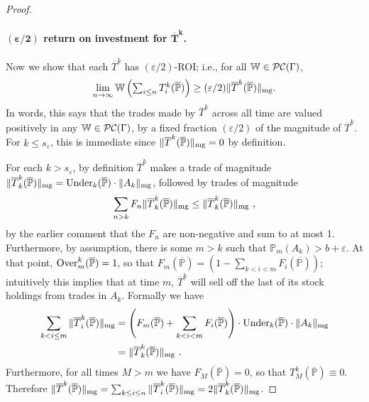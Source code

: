\documentclass[authordate,onecolumn,noenvironments]{miri-tech-article}
\numberwithin{equation}{subsection}
\newcommand{\seq}[1]{{\overline{#1}}}
\newcommand{\aff}{A}
\newcommand{\trade}{T}%
\newcommand{\Trader}{\seq{\trade}} %
\newcommand{\magnit}[1]{{\|#1\|_{\rm mg}}} %
\newcommand{\BelState}{\mathbb{P}}
\newcommand{\pt}{\BelState}
\newcommand{\MP}{\seq{\pt}}
\newcommand{\ftn}{(\MP)} %
\newcommand{\cworlds}{\mathcal{P\-C}} %
\newcommand{\World}{\mathbb{W}}
\newcommand{\Theory}{\Gamma}
\newcommand{\underpriced}{{\rm Under}}
\newcommand{\overpriced}{{\rm Over}}
\newcommand{\localportfoliovalue}{b}
\begin{document}
\begin{proof}
\paragraph{$\bm{(\varepsilon/2)}$ return on investment for $\bm{\Trader^k}$.}

Now we show that each $\Trader^k$ 
has $(\varepsilon/2)$-ROI;  i.e., for all $\World \in \cworlds(\Theory)$, 
%
 \[ \lim_{n \to\infty}\World\left( {\textstyle \sum_{i \leq n} \trade^k_i(\MP)}\right)
\geq
(\varepsilon/2)
\magnit{\Trader^k(\MP)} . \]
%
In words, this says that the trades made by $\Trader^k$ across all time are valued positively in any $\World\in\cworlds(\Theory)$, by a fixed fraction 
$(\varepsilon/2)$ of the magnitude of $\Trader^k$. For $k \leq s_\varepsilon$, this is immediate since $\magnit{\Trader^k(\MP)}=0$ by definition. 

For each $k> s_\varepsilon$,  by definition $\Trader^k$ makes a trade of magnitude $\magnit{\Trader^k_k \ftn} = \underpriced_k(\MP) \cdot \magnit{ \aff_k }$,
followed by trades of magnitude 
%
\[ \sum_{n>k} F_n \magnit{\Trader^k_k(\MP)} \leq    \magnit{\Trader^k_k(\MP)}\ , \]
%
by the earlier comment that the $F_n$ are non-negative and sum to at most 1. Furthermore, by assumption, there is some $m>k$ such that 
$\pt_{m}(\aff_{k})  > \localportfoliovalue + \varepsilon$. At that point, $\overpriced_m^k \ftn = 1$, so that $F_m\ftn = 
\left(1 - \sum_{k<i<m}F_i\ftn\right) $; intuitively this implies that at time $m$, $\Trader^k$ will sell off the last of its stock holdings from trades 
in $\aff_{k}$. Formally we have 
%
\begin{align*}
\sum_{k< i \leq m} \magnit{\Trader^k_i(\MP)} 
&= \left(F_m\ftn +  \sum_{k<i <m} F_i\ftn \right) \cdot
 \underpriced_k\ftn  \cdot \magnit{\aff_k }\\
 &= \magnit{\Trader^k_k(\MP)}\ . 
\end{align*}
%
Furthermore, for all times $M>m$ we have $F_M \ftn = 0$,  so that $\trade^k_M \ftn \equiv 0$. Therefore $ \magnit{\Trader^k(\MP)}= \sum_{k\leq
i \leq n} \magnit{\Trader^k_i(\MP)}= 2\magnit{\Trader^k_k(\MP)}$. 


\end{proof}
\end{document}
